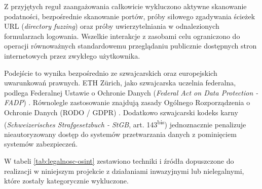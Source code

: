 Z przyjętych reguł zaangażowania całkowicie wykluczono aktywne skanowanie podatności, bezpośrednie skanowanie portów, próby siłowego zgadywania ścieżek URL (\textit{directory fuzzing}) oraz próby uwierzytelniania w odnalezionych formularzach logowania. Wszelkie interakcje z zasobami celu ograniczono do operacji równoważnych standardowemu przeglądaniu publicznie dostępnych stron internetowych przez zwykłego użytkownika.

Podejście to wynika bezpośrednio ze szwajcarskich oraz europejskich uwarunkowań prawnych. ETH Zürich, jako szwajcarska uczelnia federalna, podlega Federalnej Ustawie o Ochronie Danych (\textit{Federal Act on Data Protection - FADP}) \cite{fadp2020}. Równolegle zastosowanie znajdują zasady Ogólnego Rozporządzenia o Ochronie Danych (RODO / GDPR) \cite{gdpr2016}. Dodatkowo szwajcarski kodeks karny (\textit{Schweizerisches Strafgesetzbuch - StGB}, art. 143\textsuperscript{bis}) jednoznacznie penalizuje nieautoryzowany dostęp do systemów przetwarzania danych z pominięciem systemów zabezpieczeń.

W tabeli \ref{tab:legalnosc-osint} zestawiono techniki i źródła dopuszczone do realizacji w niniejszym projekcie z działaniami inwazyjnymi lub nielegalnymi, które zostały kategorycznie wykluczone.

